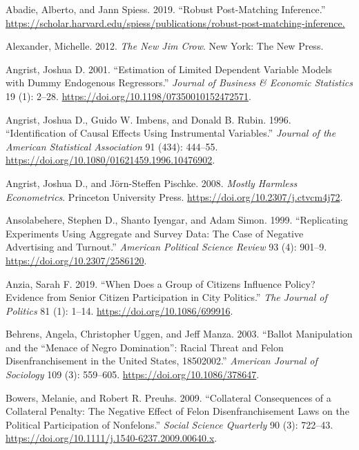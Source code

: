 \documentclass[12pt,]{article}
\begin{document}
\setlength{\parindent}{-0.5in}
\setlength{\leftskip}{0.5in}

\noindent

\hypertarget{refs}{}
\leavevmode\hypertarget{ref-Abadie2019}{}%
Abadie, Alberto, and Jann Spiess. 2019. ``Robust Post-Matching Inference.'' \url{https://scholar.harvard.edu/spiess/publications/robust-post-matching-inference.}

\leavevmode\hypertarget{ref-Alexander2012}{}%
Alexander, Michelle. 2012. \emph{The New Jim Crow}. New York: The New Press.

\leavevmode\hypertarget{ref-Angrist2001}{}%
Angrist, Joshua D. 2001. ``Estimation of Limited Dependent Variable Models with Dummy Endogenous Regressors.'' \emph{Journal of Business \& Economic Statistics} 19 (1): 2--28. \url{https://doi.org/10.1198/07350010152472571}.

\leavevmode\hypertarget{ref-Angrist1996}{}%
Angrist, Joshua D., Guido W. Imbens, and Donald B. Rubin. 1996. ``Identification of Causal Effects Using Instrumental Variables.'' \emph{Journal of the American Statistical Association} 91 (434): 444--55. \url{https://doi.org/10.1080/01621459.1996.10476902}.

\leavevmode\hypertarget{ref-Angrist2008}{}%
Angrist, Joshua D., and Jörn-Steffen Pischke. 2008. \emph{Mostly Harmless Econometrics}. Princeton University Press. \url{https://doi.org/10.2307/j.ctvcm4j72}.

\leavevmode\hypertarget{ref-Ansolabehere1999}{}%
Ansolabehere, Stephen D., Shanto Iyengar, and Adam Simon. 1999. ``Replicating Experiments Using Aggregate and Survey Data: The Case of Negative Advertising and Turnout.'' \emph{American Political Science Review} 93 (4): 901--9. \url{https://doi.org/10.2307/2586120}.

\leavevmode\hypertarget{ref-Anzia2019}{}%
Anzia, Sarah F. 2019. ``When Does a Group of Citizens Influence Policy? Evidence from Senior Citizen Participation in City Politics.'' \emph{The Journal of Politics} 81 (1): 1--14. \url{https://doi.org/10.1086/699916}.

\leavevmode\hypertarget{ref-Behrens2003}{}%
Behrens, Angela, Christopher Uggen, and Jeff Manza. 2003. ``Ballot Manipulation and the ``Menace of Negro Domination'': Racial Threat and Felon Disenfranchisement in the United States, 18502002.'' \emph{American Journal of Sociology} 109 (3): 559--605. \url{https://doi.org/10.1086/378647}.

\leavevmode\hypertarget{ref-Bowers2009}{}%
Bowers, Melanie, and Robert R. Preuhs. 2009. ``Collateral Consequences of a Collateral Penalty: The Negative Effect of Felon Disenfranchisement Laws on the Political Participation of Nonfelons.'' \emph{Social Science Quarterly} 90 (3): 722--43. \url{https://doi.org/10.1111/j.1540-6237.2009.00640.x}.
\end{document}
